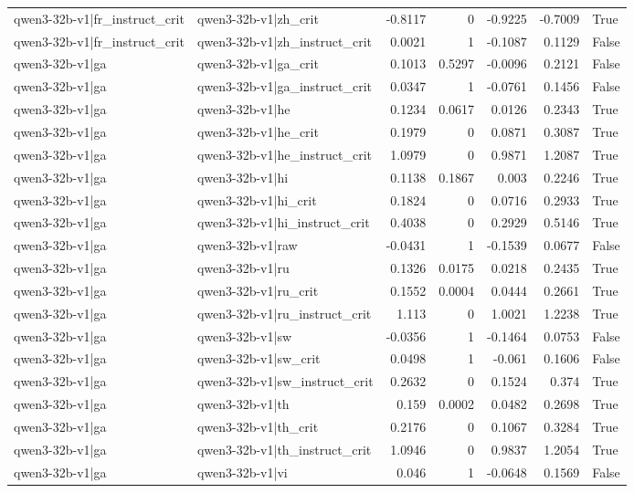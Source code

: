 \begin{table}
\begin{tabular}{l l r r r r l}
qwen3-32b-v1|fr_instruct_crit & qwen3-32b-v1|zh_crit & -0.8117 & 0 & -0.9225 & -0.7009 & True \\
qwen3-32b-v1|fr_instruct_crit & qwen3-32b-v1|zh_instruct_crit & 0.0021 & 1 & -0.1087 & 0.1129 & False \\
qwen3-32b-v1|ga & qwen3-32b-v1|ga_crit & 0.1013 & 0.5297 & -0.0096 & 0.2121 & False \\
qwen3-32b-v1|ga & qwen3-32b-v1|ga_instruct_crit & 0.0347 & 1 & -0.0761 & 0.1456 & False \\
qwen3-32b-v1|ga & qwen3-32b-v1|he & 0.1234 & 0.0617 & 0.0126 & 0.2343 & True \\
qwen3-32b-v1|ga & qwen3-32b-v1|he_crit & 0.1979 & 0 & 0.0871 & 0.3087 & True \\
qwen3-32b-v1|ga & qwen3-32b-v1|he_instruct_crit & 1.0979 & 0 & 0.9871 & 1.2087 & True \\
qwen3-32b-v1|ga & qwen3-32b-v1|hi & 0.1138 & 0.1867 & 0.003 & 0.2246 & True \\
qwen3-32b-v1|ga & qwen3-32b-v1|hi_crit & 0.1824 & 0 & 0.0716 & 0.2933 & True \\
qwen3-32b-v1|ga & qwen3-32b-v1|hi_instruct_crit & 0.4038 & 0 & 0.2929 & 0.5146 & True \\
qwen3-32b-v1|ga & qwen3-32b-v1|raw & -0.0431 & 1 & -0.1539 & 0.0677 & False \\
qwen3-32b-v1|ga & qwen3-32b-v1|ru & 0.1326 & 0.0175 & 0.0218 & 0.2435 & True \\
qwen3-32b-v1|ga & qwen3-32b-v1|ru_crit & 0.1552 & 0.0004 & 0.0444 & 0.2661 & True \\
qwen3-32b-v1|ga & qwen3-32b-v1|ru_instruct_crit & 1.113 & 0 & 1.0021 & 1.2238 & True \\
qwen3-32b-v1|ga & qwen3-32b-v1|sw & -0.0356 & 1 & -0.1464 & 0.0753 & False \\
qwen3-32b-v1|ga & qwen3-32b-v1|sw_crit & 0.0498 & 1 & -0.061 & 0.1606 & False \\
qwen3-32b-v1|ga & qwen3-32b-v1|sw_instruct_crit & 0.2632 & 0 & 0.1524 & 0.374 & True \\
qwen3-32b-v1|ga & qwen3-32b-v1|th & 0.159 & 0.0002 & 0.0482 & 0.2698 & True \\
qwen3-32b-v1|ga & qwen3-32b-v1|th_crit & 0.2176 & 0 & 0.1067 & 0.3284 & True \\
qwen3-32b-v1|ga & qwen3-32b-v1|th_instruct_crit & 1.0946 & 0 & 0.9837 & 1.2054 & True \\
qwen3-32b-v1|ga & qwen3-32b-v1|vi & 0.046 & 1 & -0.0648 & 0.1569 & False \\

\end{tabular}
\end{table}
